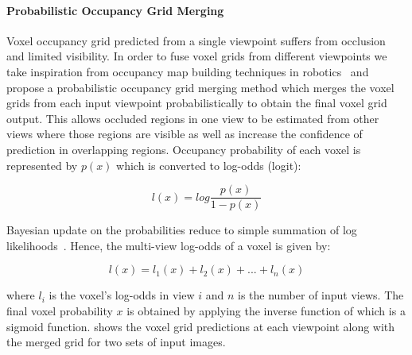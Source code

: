 \paragraph{Probabilistic Occupancy Grid Merging}\vspace{-4mm}
Voxel occupancy grid predicted from a single viewpoint suffers from occlusion and limited visibility.
In order to fuse voxel grids from different viewpoints we take inspiration from occupancy map building techniques in robotics~\cite{grisetti2007improved,konolige1997improved} and propose a probabilistic occupancy grid merging method which merges the voxel grids from each input viewpoint probabilistically to obtain the final voxel grid output.
This allows occluded regions in one view to be estimated from other views where those regions are visible as well as increase the confidence of prediction in overlapping regions.
Occupancy probability of each voxel is represented by $p(x)$ which is converted to log-odds (logit):

\begin{equation}
    l(x) = log \frac{p(x)}{1 - p(x)}
    \label{equ:logodds}
\end{equation}

Bayesian update on the probabilities reduce to simple summation of log likelihoods~\cite{konolige1997improved}. Hence, the multi-view log-odds of a voxel is given by:

\begin{equation}
    l(x) = l_1(x) + l_2(x) + ... + l_n(x)
    \label{equ:logodds_sum}
\end{equation}

\noindent where $l_i$ is the voxel's log-odds in view $i$ and $n$ is the number of input views.
The final voxel probability $x$ is obtained by applying the inverse function of  which is a sigmoid function.
 shows the voxel grid predictions at each viewpoint along with the merged grid for two sets of input images.

